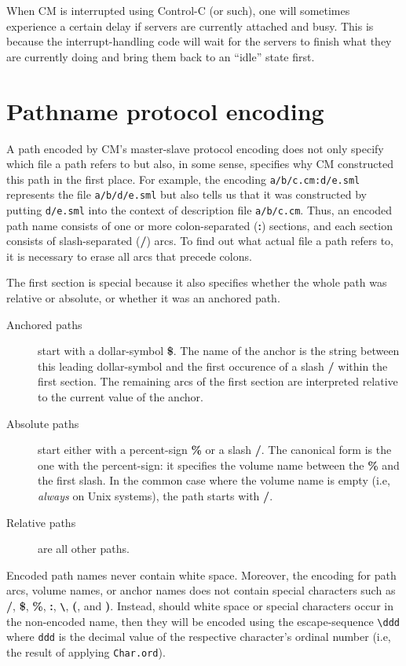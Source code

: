 When CM is interrupted using Control-C (or such), one will sometimes
experience a certain delay if servers are currently attached and busy.
This is because the interrupt-handling code will wait for the servers
to finish what they are currently doing and bring them back to an
``idle'' state first.

\section{Pathname protocol encoding}
\label{sec:pathencode}

A path encoded by CM's master-slave protocol encoding does not only
specify which file a path refers to but also, in some sense, specifies
why CM constructed this path in the first place.  For example, the
encoding {\tt a/b/c.cm:d/e.sml} represents the file {\tt a/b/d/e.sml}
but also tells us that it was constructed by putting {\tt d/e.sml}
into the context of description file {\tt a/b/c.cm}.  Thus, an encoded
path name consists of one or more colon-separated ({\bf :}) sections,
and each section consists of slash-separated ({\bf /}) arcs.  To find
out what actual file a path refers to, it is necessary to erase all
arcs that precede colons.

The first section is special because it also specifies whether the
whole path was relative or absolute, or whether it was an anchored
path.

\begin{description}
\item[Anchored paths] start with a dollar-symbol {\bf \$}.  The name
of the anchor is the string between this leading dollar-symbol and the
first occurence of a slash {\bf /} within the first section.  The
remaining arcs of the first section are interpreted relative to the
current value of the anchor.
\item[Absolute paths] start either with a percent-sign {\bf \%} or a
slash {\bf /}.  The canonical form is the one with the percent-sign:
it specifies the volume name between the {\bf \%} and the first slash.
In the common case where the volume name is empty (i.e, {\em always} on
Unix systems), the path starts with {\bf /}.
\item[Relative paths] are all other paths.
\end{description}

Encoded path names never contain white space.  Moreover, the encoding
for path arcs, volume names, or anchor names does not contain special
characters such as {\bf /}, {\bf \$}, {\bf \%}, {\bf :}, {\bf
\verb|\|}, {\bf (}, and {\bf )}.  Instead, should white space or
special characters occur in the non-encoded name, then they will be
encoded using the escape-sequence \verb|\ddd| where {\tt ddd} is the
decimal value of the respective character's ordinal number (i.e, the
result of applying {\tt Char.ord}).

